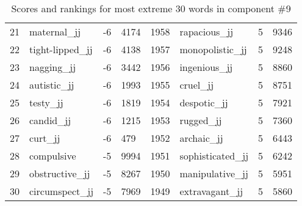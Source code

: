 \begin{table}[tbp]
\begin{tabular}{| rlr@{.}l | rlr@{.}l |}
    21 & maternal\_jj & -6 & 4174    &    1958 & rapacious\_jj & 5 & 9346 \\
    22 & tight-lipped\_jj & -6 & 4138    &    1957 & monopolistic\_jj & 5 & 9248 \\
    23 & nagging\_jj & -6 & 3442    &    1956 & ingenious\_jj & 5 & 8860 \\
    24 & autistic\_jj & -6 & 1993    &    1955 & cruel\_jj & 5 & 8751 \\
    25 & testy\_jj & -6 & 1819    &    1954 & despotic\_jj & 5 & 7921 \\
    26 & candid\_jj & -6 & 1215    &    1953 & rugged\_jj & 5 & 7360 \\
    27 & curt\_jj & -6 & 479    &    1952 & archaic\_jj & 5 & 6443 \\
    28 & compulsive & -5 & 9994    &    1951 & sophisticated\_jj & 5 & 6242 \\
    29 & obstructive\_jj & -5 & 8267    &    1950 & manipulative\_jj & 5 & 5951 \\
    30 & circumspect\_jj & -5 & 7969    &    1949 & extravagant\_jj & 5 & 5860 \\
    \hline
    \end{tabular}
    \caption{Scores and rankings for most extreme 30 words in component \#9} 
\end{table}
\clearpage
